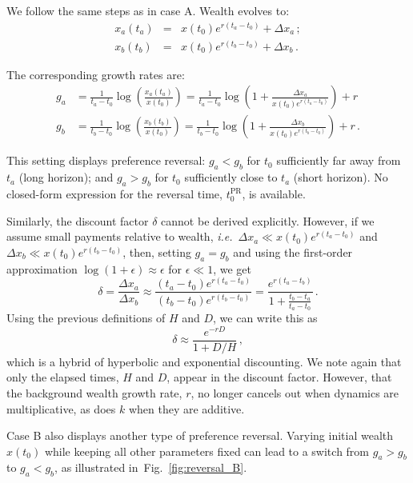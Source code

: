 \documentclass[11pt]{article}
\newcommand{\elabel}[1]{\label{eq:#1}}
\newcommand{\ie}{{\it i.e.}\ }
\newcommand{\fref}[1]{Fig.~\ref{fig:#1}}
\newcommand{\be}{\begin{equation}}
\newcommand{\ee}{\end{equation}}
\newcommand{\bea}{\begin{eqnarray}}
\newcommand{\eea}{\end{eqnarray}}
\newcommand{\Dx}{\Delta x}
\newcommand{\del}{D}
\newcommand{\hor}{H}
\numberwithin{equation}{section}
\begin{document}
We follow the same steps as in case A. Wealth evolves to:
\bea
x_a\left(t_a\right) &=& x\left(t_0\right) e^{r(t_a-t_0)} + \Dx_a\,;\\
x_b\left(t_b\right) &=& x\left(t_0\right) e^{r(t_b-t_0)} + \Dx_b\,.
\eea

The corresponding growth rates are:
\bea
g_a &= \frac{1}{t_a-t_0} \log{\left(\frac{x_a\left(t_a\right)}{x\left(t_0\right)}\right)} = \frac{1}{t_a-t_0}\log{\left(1 + \frac{\Dx_a}{x\left(t_0\right)e^{r(t_a-t_0)}}\right)} + r \elabel{ga_B}\\
g_b &= \frac{1}{t_b-t_0} \log{\left(\frac{x_b\left(t_b\right)}{x\left(t_0\right)}\right)} = \frac{1}{t_b-t_0}\log{\left(1 + \frac{\Dx_b}{x\left(t_0\right)e^{r(t_b-t_0)}}\right)} + r\,.\elabel{gb_B}
\eea

This setting displays preference reversal: $g_a<g_b$ for $t_0$ sufficiently far away from $t_a$ (long horizon); and $g_a>g_b$ for $t_0$ sufficiently close to $t_a$ (short horizon). No closed-form expression for the reversal time, $t_0^\text{PR}$, is available.

Similarly, the discount factor $\delta$ cannot be derived explicitly. However, if we assume small payments relative to wealth, \ie $\Dx_a \ll x\left(t_0\right)e^{r(t_a-t_0)}$ and $\Dx_b \ll x\left(t_0\right)e^{r(t_b-t_0)}$, then, setting $g_a=g_b$ and using the first-order approximation $\log(1+\epsilon)\approx\epsilon$ for $\epsilon\ll1$, we get
\be
\delta = \frac{\Dx_a}{\Dx_b} \approx \frac{(t_a-t_0)e^{r(t_a-t_0)}}{(t_b-t_0)e^{r(t_b-t_0)}} =
\frac{e^{r(t_a-t_b)}}{1+\frac{t_b-t_a}{t_a-t_0}}\,.
\ee
Using the previous definitions of $\hor$ and $\del$, we can write this as
\be
\delta \approx \frac{e^{-r\del}}{1+\del/\hor}\,,
\ee
which is a hybrid of hyperbolic and exponential discounting. We note again that only the elapsed times, $\hor$ and $\del$, appear in the discount factor. However, that the background wealth growth rate, $r$, no longer cancels out when dynamics are multiplicative, as does $k$ when they are additive.

Case B also displays another type of preference reversal. Varying initial wealth $x(t_0)$ while keeping all other parameters fixed can lead to a switch from $g_a>g_b$ to $g_a<g_b$, as illustrated in~\fref{reversal_B}.
\end{document}
